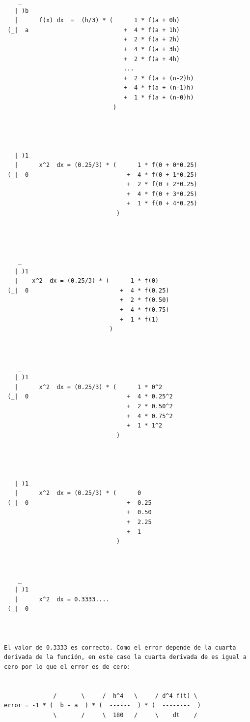 \begin{verbatim}
    _ 
   | )b
   |      f(x) dx  =  (h/3) * (      1 * f(a + 0h)  
 (_|  a                           +  4 * f(a + 1h)  
                                  +  2 * f(a + 2h)  
                                  +  4 * f(a + 3h) 
                                  +  2 * f(a + 4h) 
                                  ...
                                  +  2 * f(a + (n-2)h) 
                                  +  4 * f(a + (n-1)h) 
                                  +  1 * f(a + (n-0)h)
                               ) 



    _ 
   | )1
   |      x^2  dx = (0.25/3) * (      1 * f(0 + 0*0.25)  
 (_|  0                            +  4 * f(0 + 1*0.25)  
                                   +  2 * f(0 + 2*0.25)  
                                   +  4 * f(0 + 3*0.25) 
                                   +  1 * f(0 + 4*0.25) 
                                )




    _ 
   | )1   
   |    x^2  dx = (0.25/3) * (      1 * f(0)  
 (_|  0                          +  4 * f(0.25)  
                                 +  2 * f(0.50)  
                                 +  4 * f(0.75) 
                                 +  1 * f(1) 
                              )



    _ 
   | )1                             
   |      x^2  dx = (0.25/3) * (      1 * 0^2  
 (_|  0                            +  4 * 0.25^2          
                                   +  2 * 0.50^2 
                                   +  4 * 0.75^2
                                   +  1 * 1^2
                                )



    _ 
   | )1
   |      x^2  dx = (0.25/3) * (      0  
 (_|  0                            +  0.25  
                                   +  0.50  
                                   +  2.25
                                   +  1 
                                )



    _ 
   | )1
   |      x^2  dx = 0.3333.... 
 (_|  0
       


El valor de 0.3333 es correcto. Como el error depende de la cuarta derivada de la función, en este caso la cuarta derivada de es igual a cero por lo que el error es de cero:


              /       \     /  h^4   \     / d^4 f(t) \
error = -1 * (  b - a  ) * (  ------  ) * (  --------  )
              \       /     \  180   /     \    dt    /




\end{verbatim}

